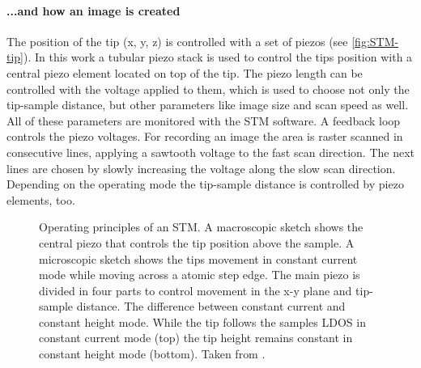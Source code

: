 \paragraph{...and how an image is created}
The position of the tip (x, y, z) is controlled with a set of piezos (see \autoref{fig:STM-tip}). In this work a tubular piezo stack is used to control the tips position with a central piezo element located on top of the tip. The piezo length can be controlled with the voltage applied to them, which is used to choose not only the tip-sample distance, but other parameters like image size and scan speed as well. All of these parameters are monitored with the STM software. A feedback loop controls the piezo voltages. For recording an image the area is raster scanned in consecutive lines, applying a sawtooth voltage to the fast scan direction. The next lines are chosen by slowly increasing the voltage along the slow scan direction. Depending on the operating mode the tip-sample distance is controlled by piezo elements, too.


\begin{figure}\centering
	\caption{Operating principles of an STM.  A macroscopic sketch  shows the central piezo that controls the tip position above the sample. A microscopic sketch shows the tips movement in constant current mode while moving across a atomic step edge. The main piezo is divided in four parts to control movement in the x-y plane and tip-sample distance\cite{STM-rutgers}.  The difference between constant current and constant height mode. While the tip follows the samples LDOS in constant current mode (top) the tip height remains constant in constant height mode (bottom). Taken from \cite{diss-manuela}.}
	\label{fig:STM-sketch}
\end{figure}

